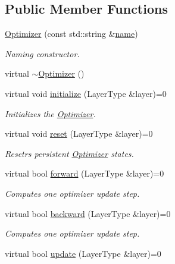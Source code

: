 \subsection*{Public Member Functions}
\begin{DoxyCompactItemize}
\item 
\hyperlink{classffnn_1_1optimizer_1_1_optimizer_a5daf7f0191df7c672247e0d5a25fbafa}{Optimizer} (const std\-::string \&\hyperlink{classffnn_1_1optimizer_1_1_optimizer_a9c472d1e2ef75decdae1cf2db7582582}{name})
\begin{DoxyCompactList}\small\item\em Naming constructor. \end{DoxyCompactList}\item 
virtual \hyperlink{classffnn_1_1optimizer_1_1_optimizer_ad16c1cab142fcc9542da0ef98df75f47}{$\sim$\-Optimizer} ()
\item 
virtual void \hyperlink{classffnn_1_1optimizer_1_1_optimizer_a4302b66ba9b013ae4833eca235ff306a}{initialize} (Layer\-Type \&layer)=0
\begin{DoxyCompactList}\small\item\em Initializes the \hyperlink{classffnn_1_1optimizer_1_1_optimizer}{Optimizer}. \end{DoxyCompactList}\item 
virtual void \hyperlink{classffnn_1_1optimizer_1_1_optimizer_ade04e7582eb7b833713a9bd33e0e8346}{reset} (Layer\-Type \&layer)=0
\begin{DoxyCompactList}\small\item\em Resetrs persistent \hyperlink{classffnn_1_1optimizer_1_1_optimizer}{Optimizer} states. \end{DoxyCompactList}\item 
virtual bool \hyperlink{classffnn_1_1optimizer_1_1_optimizer_a80505cfdeba0a3c8d1db19a2821613f2}{forward} (Layer\-Type \&layer)=0
\begin{DoxyCompactList}\small\item\em Computes one optimizer update step. \end{DoxyCompactList}\item 
virtual bool \hyperlink{classffnn_1_1optimizer_1_1_optimizer_ab1f9b1cae01f93f53ecf7119bedb6369}{backward} (Layer\-Type \&layer)=0
\begin{DoxyCompactList}\small\item\em Computes one optimizer update step. \end{DoxyCompactList}\item 
virtual bool \hyperlink{classffnn_1_1optimizer_1_1_optimizer_a7c88c2794446e03ccd41628bb25d7a07}{update} (Layer\-Type \&layer)=0

\end{DoxyCompactItemize}
